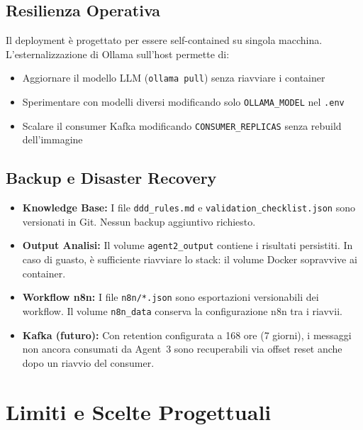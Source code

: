 \documentclass[12pt,a4paper]{report}
\begin{document}
\section{Resilienza Operativa}

Il deployment è progettato per essere self-contained su singola macchina.
L'esternalizzazione di Ollama sull'host permette di:
\begin{itemize}
  \item Aggiornare il modello LLM (\texttt{ollama pull}) senza riavviare
        i container
  \item Sperimentare con modelli diversi modificando solo
        \texttt{OLLAMA\_MODEL} nel \texttt{.env}
  \item Scalare il consumer Kafka modificando \texttt{CONSUMER\_REPLICAS}
        senza rebuild dell'immagine
\end{itemize}

\section{Backup e Disaster Recovery}

\begin{itemize}
  \item \textbf{Knowledge Base:} I file \texttt{ddd\_rules.md} e
        \texttt{validation\_checklist.json} sono versionati in Git.
        Nessun backup aggiuntivo richiesto.

  \item \textbf{Output Analisi:} Il volume \texttt{agent2\_output} contiene
        i risultati persistiti. In caso di guasto, è sufficiente riavviare
        lo stack: il volume Docker sopravvive ai container.

  \item \textbf{Workflow n8n:} I file \texttt{n8n/*.json} sono esportazioni
        versionabili dei workflow. Il volume \texttt{n8n\_data} conserva
        la configurazione n8n tra i riavvii.

  \item \textbf{Kafka (futuro):} Con retention configurata a 168 ore (7 giorni),
        i messaggi non ancora consumati da Agent~3 sono recuperabili via
        offset reset anche dopo un riavvio del consumer.
\end{itemize}

\chapter{Limiti e Scelte Progettuali}
\end{document}
